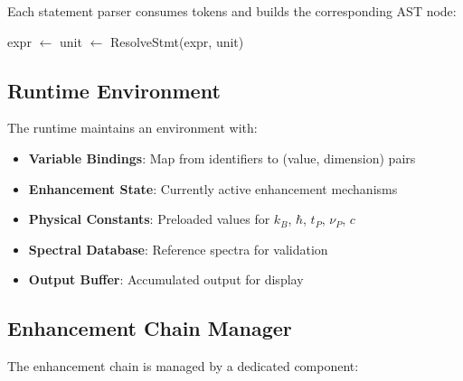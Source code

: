 \documentclass[twocolumn,10pt]{article}
\begin{document}
Each statement parser consumes tokens and builds the corresponding AST node:

\begin{algorithm}
\caption{Parse Resolve Statement}
\begin{algorithmic}[1]
    \State {}
        \State {}
    \EndIf
    \State {}
    \State expr $\gets$ 
    \State unit $\gets$ 
    \State {}
    \State \Return ResolveStmt(expr, unit)
\EndFunction
\end{algorithmic}
\end{algorithm}

\subsection{Runtime Environment}

The runtime maintains an environment with:

\begin{itemize}
    \item \textbf{Variable Bindings}: Map from identifiers to (value, dimension) pairs
    \item \textbf{Enhancement State}: Currently active enhancement mechanisms
    \item \textbf{Physical Constants}: Preloaded values for $k_B$, $\hbar$, $t_P$, $\nu_P$, $c$
    \item \textbf{Spectral Database}: Reference spectra for validation
    \item \textbf{Output Buffer}: Accumulated output for display
\end{itemize}

\subsection{Enhancement Chain Manager}

The enhancement chain is managed by a dedicated component:
\end{document}
